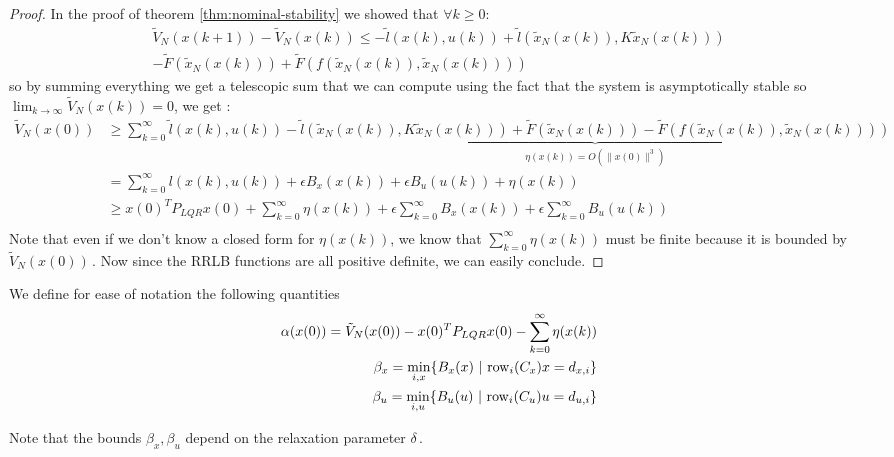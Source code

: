 \documentclass[12pt]{article}
\begin{document}
\begin{proof}
	In the proof of theorem \ref{thm:nominal-stability} we showed that $\forall k\geq 0$:
	\begin{multline*}
		\tilde{V}_N(x(k+1))-\tilde{V}_N(x(k))\leq-\tilde{l}(x(k),u(k))+\tilde{l}(\tilde{x}_N(x(k)), K\tilde{x}_N(x(k)))\\
		-\tilde{F}(\tilde{x}_N(x(k)))+\tilde{F}(f(\tilde{x}_N(x(k)),\tilde{x}_N(x(k))))
	\end{multline*}
	so by summing everything we get a telescopic sum that we can compute using the fact that the system is asymptotically stable so $\lim_{k\to\infty}\tilde{V}_N(x(k))=0$, we get :
	\begin{align*}
		\tilde{V}_N(x(0))&\geq\sum_{k=0}^\infty\tilde{l}(x(k),u(k))-\underbrace{\tilde{l}(\tilde{x}_N(x(k)), K\tilde{x}_N(x(k)))+\tilde{F}(\tilde{x}_N(x(k)))-\tilde{F}(f(\tilde{x}_N(x(k)),\tilde{x}_N(x(k))))}_{\eta(x(k))=O(\|x(0)\|^3)}\\
		&=\sum_{k=0}^\infty l(x(k), u(k))+\epsilon B_x(x(k))+\epsilon B_u(u(k))+\eta(x(k))\\
		&\geq x(0)^TP_{LQR}x(0)+\sum_{k=0}^\infty\eta(x(k))+\epsilon\sum_{k=0}^\infty B_x(x(k))+\epsilon\sum_{k=0}^\infty B_u(u(k))\\
	\end{align*}
	Note that even if we don't know a closed form for $\eta(x(k))$, we know that $\sum_{k=0}^\infty\eta(x(k))$ must be finite because it is bounded by $\tilde{V}_N(x(0))$\,.
	Now since the RRLB functions are all positive definite, we can easily conclude.
\end{proof}

We define for ease of notation the following quantities
\begin{align}
	\begin{split}
		\alpha(x(0))=\tilde{V}_N(x(0))-x(0)^TP_{LQR}x(0)-\sum_{k=0}^\infty\eta(x(k))
	\end{split}\\
	\begin{split}
		\beta_x=\underset{i,x}{\min}\{B_x(x)~|~\rm{row}_i(C_x)x=d_{x,i}\}
	\end{split}\\
	\begin{split}
		\beta_u=\underset{i,u}{\min}\{B_u(u)~|~\rm{row}_i(C_u)u=d_{u,i}\}
	\end{split}
\end{align}

Note that the bounds $\beta_x,\beta_u$ depend on the relaxation parameter $\delta$\,.
\end{document}
